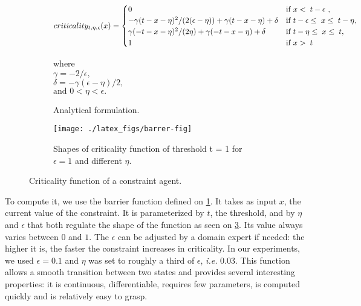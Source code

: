 \begin{figure}
	\centering
	\begin{subfigure}[b]{\textwidth}
	\centering
	\scriptsize
	
		\[criticality_{t,\eta,\epsilon}(x)=
			\begin{cases}
				0		&\text{if \( x < \; t - \epsilon \) },\\
				-\gamma ( t - x - \eta ) ^ 2 / ( 2 ( \epsilon - \eta)) + \gamma ( t - x - \eta ) + \delta &\text{if \(t - \epsilon \leq \;x \leq \;t - \eta \)},\\
				\gamma (-t-x-\eta)^2/(2 \eta)+\gamma (-t-x-\eta) + \delta &\text{if \(t - \eta \leq \;x \leq \;t\)},\\
				1	&\text{if \( x > \; t \)}
			\end{cases}\]

		where\\
		$\gamma = -2/ \epsilon,$\\
		$\delta = -\gamma (\epsilon - \eta )/2,$\\
		$\text{and } 0 < \eta < \epsilon.$
	\caption{Analytical formulation.}\label{crit_func}
	\end{subfigure}
	
	\begin{subfigure}[b]{\textwidth}
		\centering
		\texttt{[image: ./latex\_figs/barrer-fig]}
		\caption{Shapes of criticality function of threshold t = 1 for \(\epsilon=1\) and different \(\eta\).}\label{crit_shapes}
	\end{subfigure}
	
\caption{Criticality function of a constraint agent.}
\end{figure}

To compute it, we use the barrier function defined on \figurename{} \ref{crit_func}. It takes as input \(x\), the current value of the constraint. It is parameterized by \(t\), the threshold, and by \(\eta\) and \(\epsilon\) that both regulate the shape of the function as seen on \figurename{} \ref{crit_shapes}. Its value always varies between \(0\) and \(1\).
The \(\epsilon\) can be adjusted by a domain expert if needed: the higher it is, the faster the constraint increases in criticality.
In our experiments, we used $\epsilon = 0.1$ and $\eta$ was set to roughly a third of $\epsilon$, \textit{i.e.} 0.03.
This function allows a smooth transition between two states and provides several interesting properties: it is continuous, differentiable, requires few parameters, is computed quickly and is relatively easy to grasp.


